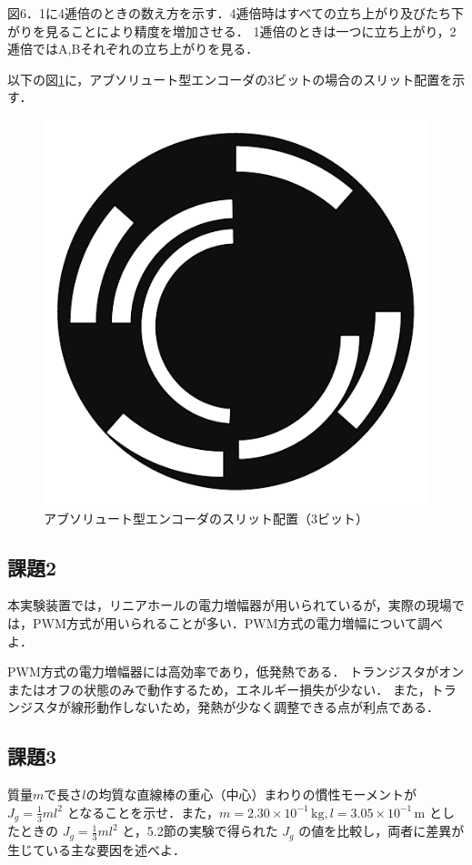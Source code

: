 図6．1に4逓倍のときの数え方を示す．4逓倍時はすべての立ち上がり及びたち下がりを見ることにより精度を増加させる．
1逓倍のときは一つに立ち上がり，2逓倍ではA,Bそれぞれの立ち上がりを見る．

以下の図\ref{fig:abs_encoder}に，アブソリュート型エンコーダの3ビットの場合のスリット配置を示す．
\begin{figure}[h]
  \centering
  \includegraphics[scale=0.5]{sozai/10.pdf}
  \caption{アブソリュート型エンコーダのスリット配置（3ビット）}
  \label{fig:abs_encoder}
\end{figure}



\subsection*{課題2}
本実験装置では，リニアホールの電力増幅器が用いられているが，実際の現場では，PWM方式が用いられることが多い．PWM方式の電力増幅について調べよ．

PWM方式の電力増幅器には高効率であり，低発熱である．
トランジスタがオンまたはオフの状態のみで動作するため，エネルギー損失が少ない．
また，トランジスタが線形動作しないため，発熱が少なく調整できる点が利点である．


\subsection*{課題3}
質量$m$で長さ$l$の均質な直線棒の重心（中心）まわりの慣性モーメントが $J_g = \frac{1}{3}ml^2$ となることを示せ．また，$m = 2.30 \times 10^{-1} \, \mathrm{kg}, l = 3.05 \times 10^{-1} \, \mathrm{m}$ としたときの $J_g = \frac{1}{3}ml^2$ と，5.2節の実験で得られた $J_g$ の値を比較し，両者に差異が生じている主な要因を述べよ．


